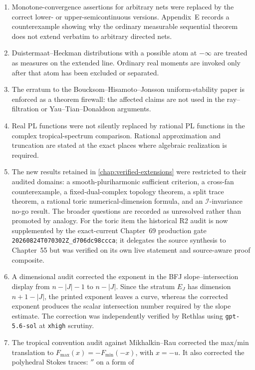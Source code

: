 \begin{enumerate}
  classes beyond the comparison loci actually proved.
\item Monotone-convergence assertions for arbitrary nets were replaced by the
  correct lower- or upper-semicontinuous versions.  Appendix~E records a
  counterexample showing why the ordinary measurable sequential theorem does
  not extend verbatim to arbitrary directed nets.
\item Duistermaat--Heckman distributions with a possible atom at \(-\infty\)
  are treated as measures on the extended line.  Ordinary real moments are
  invoked only after that atom has been excluded or separated.
\item The erratum to the Boucksom--Hisamoto--Jonsson uniform-stability paper
  is enforced as a theorem firewall: the affected claims are not used in the
  ray--filtration or Yau--Tian--Donaldson arguments.
\item Real PL functions were not silently replaced by rational PL functions
  in the complex tropical-spectrum comparison.  Rational approximation and
  truncation are stated at the exact places where algebraic realization is
  required.
\item The new results retained in \cref{chap:verified-extensions} were restricted to their audited
  domains: a smooth-pluriharmonic sufficient criterion, a cross-fan
  counterexample, a fixed-dual-complex topology theorem, a split trace
  theorem, a rational toric numerical-dimension formula, and an
  \(\mathcal I\)-invariance no-go result.  The broader questions are recorded
  as unresolved rather than promoted by analogy.  For the toric item the
  historical R2 audit is now supplemented by the exact-current Chapter~69
  production gate \texttt{20260824T070302Z\_d706dc98ccca}; it delegates the
  source synthesis to Chapter~55 but was verified on its own live statement
  and source-aware proof composite.
\item A dimensional audit corrected the exponent in the BFJ
  slope--intersection display from \(n-|J|-1\) to \(n-|J|\).  Since the
  stratum \(E_J\) has dimension \(n+1-|J|\), the printed exponent leaves a
  curve, whereas the corrected exponent produces the scalar intersection
  number required by the slope estimate.  The correction was independently
  verified by Rethlas using \texttt{gpt-5.6-sol} at \texttt{xhigh} scrutiny.
\item The tropical convention audit against Mikhalkin--Rau corrected the
  max/min translation to \(F_{\max}(x)=-F_{\min}(-x)\), with \(x=-u\).
  It also corrected the polyhedral Stokes traces: \(\dprime\) on a form of

\end{enumerate}

